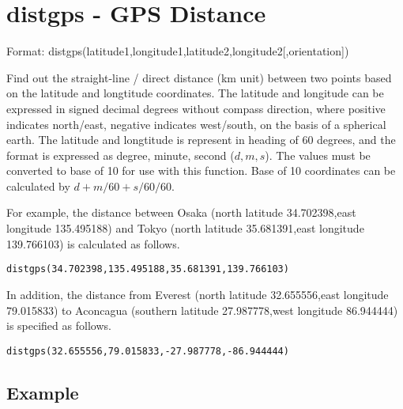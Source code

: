 
% 

\section{distgps - GPS Distance\label{sect:distgps}}

Format: distgps(latitude1,longitude1,latitude2,longitude2[,orientation])

Find out the straight-line / direct distance (km unit) between two points based on the latitude and longtitude coordinates. The latitude and longitude can be expressed in signed decimal degrees without compass direction, where positive indicates north/east, negative indicates west/south, on the basis of a spherical earth.  The latitude and longtitude is represent in heading of 60 degrees, and the format is expressed as degree, minute, second ($d,m,s$). The values must be converted to base of 10 for use with this function. 
Base of 10 coordinates can be calculated by $d+m/60+s/60/60$.  

For example, the distance between Osaka (north latitude 34.702398,east longitude 135.495188) and Tokyo (north latitude 35.681391,east longitude 139.766103) is calculated as follows. 

\begin{verbatim}
distgps(34.702398,135.495188,35.681391,139.766103)
\end{verbatim}
In addition, the distance from Everest (north latitude 32.655556,east longitude 79.015833) to Aconcagua (southern latitude 27.987778,west longitude 86.944444) is specified as follows. 
\begin{verbatim}
distgps(32.655556,79.015833,-27.987778,-86.944444)
\end{verbatim}


\subsection*{Example}


%

